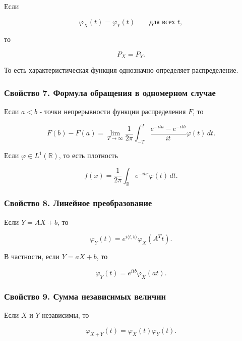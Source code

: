 \documentclass[
  11pt,
  a4paper,
]{article}
\begin{document}
Если

\[
\varphi_X(t)=\varphi_Y(t)
\qquad \text{для всех }t,
\]

то

\[
P_X=P_Y.
\]

То есть характеристическая функция однозначно определяет распределение.

\subsubsection{Свойство 7. Формула обращения в одномерном
случае}\label{ux441ux432ux43eux439ux441ux442ux432ux43e-7.-ux444ux43eux440ux43cux443ux43bux430-ux43eux431ux440ux430ux449ux435ux43dux438ux44f-ux432-ux43eux434ux43dux43eux43cux435ux440ux43dux43eux43c-ux441ux43bux443ux447ux430ux435}

Если \(a<b\) - точки непрерывности функции распределения \(F\), то

\[
F(b)-F(a)
=
\lim_{T\to\infty}
\frac1{2\pi}
\int_{-T}^{T}
\frac{e^{-ita}-e^{-itb}}{it}\varphi(t)\,dt.
\]

Если \(\varphi\in L^1(\mathbb R)\), то есть плотность

\[
f(x)=\frac1{2\pi}\int_{\mathbb R} e^{-itx}\varphi(t)\,dt.
\]

\subsubsection{Свойство 8. Линейное
преобразование}\label{ux441ux432ux43eux439ux441ux442ux432ux43e-8.-ux43bux438ux43dux435ux439ux43dux43eux435-ux43fux440ux435ux43eux431ux440ux430ux437ux43eux432ux430ux43dux438ux435}

Если \(Y=AX+b\), то

\[
\varphi_Y(t)=e^{i\langle t,b\rangle}\varphi_X(A^Tt).
\]

В частности, если \(Y=aX+b\), то

\[
\varphi_Y(t)=e^{itb}\varphi_X(at).
\]

\subsubsection{Свойство 9. Сумма независимых
величин}\label{ux441ux432ux43eux439ux441ux442ux432ux43e-9.-ux441ux443ux43cux43cux430-ux43dux435ux437ux430ux432ux438ux441ux438ux43cux44bux445-ux432ux435ux43bux438ux447ux438ux43d}

Если \(X\) и \(Y\) независимы, то

\[
\varphi_{X+Y}(t)=\varphi_X(t)\varphi_Y(t).
\]
\end{document}
